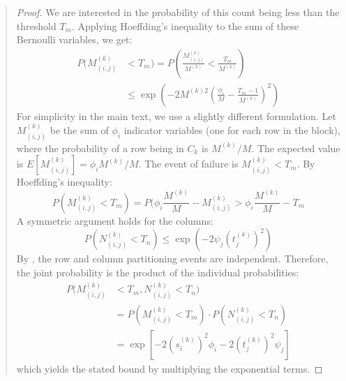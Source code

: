 \documentclass{ar2rc}
\theoremstyle{definition}
\theoremstyle{remark} %
\begin{document}
\begin{quote}
\begin{proof}
    We are interested in the probability of this count being less than the threshold $T_m$. Applying Hoeffding's inequality to the sum of these Bernoulli variables, we get:
    \begin{equation}
      \begin{aligned}
        P(M_{(i,j)}^{(k)} & < T_m) = P\left(\frac{M_{(i,j)}^{(k)}}{M^{(k)}} < \frac{T_m}{M^{(k)}}\right)              \\
                          & \le \exp\left(-2 M^{(k)2} \left(\frac{\phi_i}{M} - \frac{T_m-1}{M^{(k)}}\right)^2 \right)
      \end{aligned}
    \end{equation}
    For simplicity in the main text, we use a slightly different formulation. Let $M_{(i,j)}^{(k)}$ be the sum of $\phi_i$ indicator variables (one for each row in the block), where the probability of a row being in $C_k$ is $M^{(k)}/M$. The expected value is $E[M_{(i,j)}^{(k)}] = \phi_i M^{(k)}/M$. The event of failure is $M_{(i,j)}^{(k)} < T_m$. By Hoeffding's inequality:
    \begin{equation}
      P(M_{(i,j)}^{(k)} < T_m) = P(\phi_i \frac{M^{(k)}}{M} - M_{(i,j)}^{(k)} > \phi_i \frac{M^{(k)}}{M} - T_m
    \end{equation}
    A symmetric argument holds for the columns:
    \begin{equation}
      P(N_{(i,j)}^{(k)} < T_n) \le \exp(-2 \psi_j (t_j^{(k)})^2)
    \end{equation}
    By , the row and column partitioning events are independent. Therefore, the joint probability is the product of the individual probabilities:
    \begin{equation}
      \begin{aligned}
        P(M_{(i,j)}^{(k)} & < T_m, N_{(i,j)}^{(k)} < T_n)                                      \\
                          & = P(M_{(i,j)}^{(k)} < T_m) \cdot P(N_{(i,j)}^{(k)} < T_n)          \\
                          & = \exp\left[-2 (s_i^{(k)})^2 \phi_i -2 (t_j^{(k)})^2 \psi_j\right]
      \end{aligned}
    \end{equation}
    which yields the stated bound by multiplying the exponential terms.
  \end{proof}



\end{quote}
\end{document}
